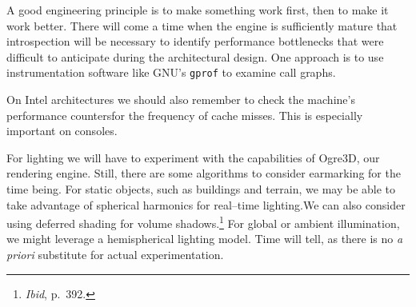 



%    



A good engineering principle is to make something work first, then to make it work better. There will come a time when the engine is sufficiently mature that introspection will be necessary to identify performance bottlenecks that were difficult to anticipate during the architectural design. One approach is to use instrumentation software like GNU's {\tt gprof} to examine call graphs.

On Intel architectures we should also remember to check the machine's performance counters for the frequency of cache misses. This is especially important on consoles.


For lighting we will have to experiment with the capabilities of Ogre3D, our rendering engine. Still, there are some algorithms to consider earmarking for the time being. For static objects, such as buildings and terrain, we may be able to take advantage of spherical harmonics for real--time lighting. We can also consider using deferred shading for volume shadows.\footnote{{\it Ibid}, p.~392.} For global or ambient illumination, we might leverage a hemispherical lighting model. Time will tell, as there is no {\it a priori} substitute for actual experimentation.

